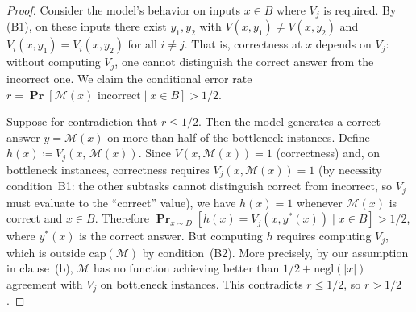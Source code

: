 \documentclass{article}
\theoremstyle{definition}
\theoremstyle{remark}
\newcommand{\calM}{\mathcal{M}}         %
\newcommand{\negl}{\mathrm{negl}}
\renewcommand{\Pr}{\operatorname{\mathbf{Pr}}}
\begin{document}
\begin{proof}
Consider the model's behavior on inputs $x \in B$ where $V_j$ is required.
By (B1), on these inputs there exist $y_1, y_2$ with $V(x,y_1) \neq V(x,y_2)$ and $V_i(x,y_1) = V_i(x,y_2)$ for all $i \neq j$.
That is, correctness at $x$ depends on $V_j$: without computing $V_j$, one cannot distinguish the correct answer from the incorrect one.
We claim the conditional error rate $r = \Pr[\calM(x) \text{ incorrect} \mid x \in B] > 1/2$.

Suppose for contradiction that $r \leq 1/2$.
Then the model generates a correct answer $y = \calM(x)$ on more than half of the bottleneck instances.
Define $h(x) \coloneqq V_j(x,\, \calM(x))$.
Since $V(x, \calM(x)) = 1$ (correctness) and, on bottleneck instances, correctness requires $V_j(x, \calM(x)) = 1$ (by necessity condition~B1: the other subtasks cannot distinguish correct from incorrect, so $V_j$ must evaluate to the ``correct'' value), we have $h(x) = 1$ whenever $\calM(x)$ is correct and $x \in B$.
Therefore $\Pr_{x \sim D}[h(x) = V_j(x, y^*(x)) \mid x \in B] > 1/2$, where $y^*(x)$ is the correct answer.
But computing $h$ requires computing $V_j$, which is outside $\mathrm{cap}(\calM)$ by condition~(B2).
More precisely, by our assumption in clause~(b), $\calM$ has no function achieving better than $1/2 + \negl(|x|)$ agreement with $V_j$ on bottleneck instances.
This contradicts $r \leq 1/2$, so $r > 1/2$.


\end{proof}
\end{document}
